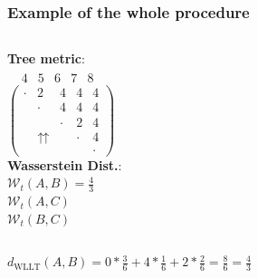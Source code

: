 \begin{frame}
\frametitle{Example of the whole procedure}
\begin{columns}[T]%
	\textbf{Tree metric}:\\
	$\begin{array}{ccccc}
	\ \ \; \textit{4} & \textit{5} & \textit{6} & \textit{7} & \textit{8}
	\end{array}$\\
	$
	\left(		
	\begin{array}{ccccc}
	\cdot & 2 & 4 & 4 & 4 \\
	& \cdot & 4 & 4 & 4 \\
	&   & \cdot & 2 & 4 \\
	& \upuparrows & & \cdot & 4\\
	&   &   &   & \cdot
	\end{array}
	\right)
	$\\
	\textbf{Wasserstein Dist.}:\\
	$\mathcal{W}_{t}(A,B) = \frac{4}{3}$\\
	$\mathcal{W}_{t}(A,C)$\\
	$\mathcal{W}_{t}(B,C)$\\
\end{columns}
\vspace{0.5cm}
$d_{\text{WLLT}}(A,B) = 0*\frac{3}{6} + 4*\frac{1}{6} + 2*\frac{2}{6} = \frac{8}{6} = \frac{4}{3}$
\end{frame}

